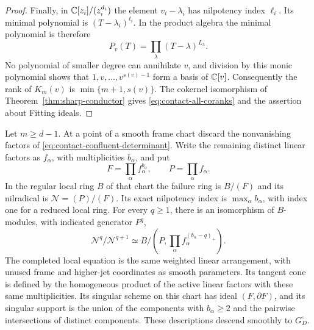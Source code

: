 \begin{proof}
Finally, in $\mathbb C[z_i]/(z_i^{d_i})$ the element $v_i-\lambda_i$
has nilpotency index $\ell_i$. Its minimal polynomial is
$(T-\lambda_i)^{\ell_i}$. In the product algebra the minimal
polynomial is therefore
\begin{equation}\label{eq:contact-minimal-polynomial}
 P_v(T)=\prod_\lambda(T-\lambda)^{L_\lambda}.
\end{equation}
No polynomial of smaller degree can annihilate $v$, and division by
this monic polynomial shows that $1,v,\ldots,v^{s(v)-1}$ form a
basis of $\mathbb C[v]$. Consequently the rank of $K_m(v)$ is
$\min\{m+1,s(v)\}$. The cokernel isomorphism of
Theorem~\ref{thm:sharp-conductor} gives
\eqref{eq:contact-all-coranks} and the assertion about Fitting ideals.
\end{proof}

\begin{theorem}
\label{thm:contact-layers}
Let $m\ge d-1$. At a point of a smooth frame chart discard the
nonvanishing factors of \eqref{eq:contact-confluent-determinant}.
Write the remaining distinct linear factors as $f_\alpha$, with
multiplicities $b_\alpha$, and put
\[
 F=\prod_\alpha f_\alpha^{b_\alpha},\qquad P=\prod_\alpha f_\alpha.
\]
In the regular local ring $B$ of that chart the failure ring is
$B/(F)$ and its nilradical is $\mathcal N=(P)/(F)$. Its exact
nilpotency index is $\max_\alpha b_\alpha$, with index one for a
reduced local ring. For every $q\ge1$, there is an isomorphism
of $B$-modules, with indicated generator $P^q$,
\begin{equation}\label{eq:contact-nilradical-layers}
 \mathcal N^q/\mathcal N^{q+1}
 \simeq
 B\big/\left(P,\prod_\alpha f_\alpha^{(b_\alpha-q)_+}\right).
\end{equation}
The completed local equation is the same weighted linear
arrangement, with unused frame and higher-jet coordinates as smooth
parameters. Its tangent cone is defined by the homogeneous product
of the active linear factors with these same multiplicities.
Its singular scheme on this chart has ideal
$(F,\partial F)$, and its singular support is the union of the
components with $b_\alpha\ge2$ and the pairwise intersections of
distinct components. These descriptions descend smoothly to
$G_D^\circ$.
\end{theorem}
